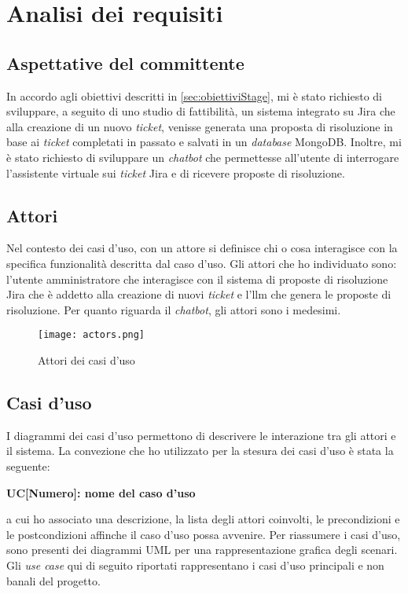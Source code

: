 \section{Analisi dei requisiti}
\subsection{Aspettative del committente}
In accordo agli obiettivi descritti in \ref{sec:obiettiviStage}, mi è stato richiesto di sviluppare, a seguito di uno studio di fattibilità, un sistema integrato su Jira che alla creazione di un nuovo \textit{ticket}, venisse generata una proposta di risoluzione in base ai \textit{ticket} completati in passato e salvati in un \textit{database} MongoDB.
Inoltre, mi è stato richiesto di sviluppare un \textit{chatbot} che permettesse all'utente di interrogare l'assistente virtuale sui \textit{ticket} Jira e di ricevere proposte di risoluzione.
\subsection{Attori}
Nel contesto dei casi d'uso, con un attore si definisce chi o cosa interagisce con la specifica funzionalità descritta dal caso d'uso.
Gli attori che ho individuato sono: l'utente amministratore che interagisce con il sistema di proposte di risoluzione Jira che è addetto alla creazione di nuovi \textit{ticket} e l'\gls{llm} che genera le proposte di risoluzione.
Per quanto riguarda il \textit{chatbot}, gli attori sono i medesimi.
\begin{figure}[H]
    \centering
    \texttt{[image: actors.png]}
    \caption{Attori dei casi d'uso}
    \label{fig:attori}
\end{figure}
\subsection{Casi d'uso}
I diagrammi dei casi d'uso permettono di descrivere le interazione tra gli attori e il sistema.  
La convezione che ho utilizzato per la stesura dei casi d'uso è stata la seguente:
\begin{center}
    \textbf{{UC[Numero]}: nome del caso d'uso}
\end{center}
a cui ho associato una descrizione, la lista degli attori coinvolti, le precondizioni e le postcondizioni affinche il caso d'uso possa avvenire.
Per riassumere i casi d'uso, sono presenti dei diagrammi UML per una rappresentazione grafica degli scenari.
Gli \textit{use case} qui di seguito riportati rappresentano i casi d'uso principali e non banali del progetto.
